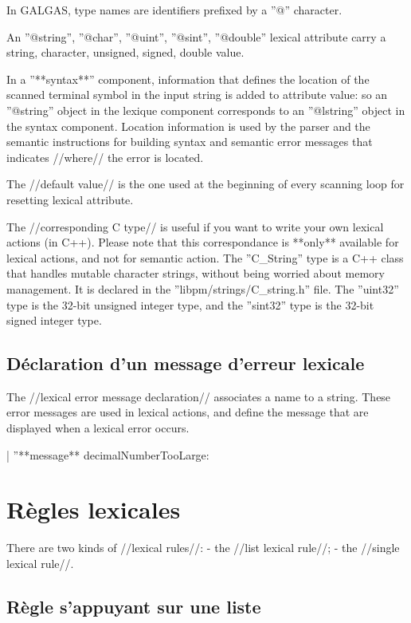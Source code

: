 In GALGAS, type names are identifiers prefixed by a ''@'' character.

An ''@string'', ''@char'', ''@uint'', ''@sint'', ''@double'' lexical attribute carry a string, character, unsigned, signed, double value.

In a ''**syntax**'' component, information that defines the location of the scanned terminal symbol in the input string is added to attribute value: so an ''@string'' object in the lexique component corresponds to an ''@lstring'' object in the syntax component. Location information is used by the parser and the semantic instructions for building syntax and semantic error messages that indicates //where// the error is located.

The //default value// is the one used at the beginning of every scanning loop for resetting lexical attribute.

The //corresponding C type// is useful if you want to write your own lexical actions (in C++). Please note that this correspondance is **only** available for lexical actions, and not for semantic action. The ''C\_String'' type is a C++ class that handles mutable character strings, without being worried about memory management. It is declared in the ''libpm/strings/C\_string.h'' file. The ''uint32'' type is the 32-bit unsigned integer type, and the ''sint32'' type is the 32-bit signed integer type. 
 

\subsection{Déclaration d'un message d'erreur lexicale}

The //lexical error message declaration// associates a name to a string. These error messages are used in lexical actions, and define the message that are displayed when a lexical error occurs.

|  ''**message** decimalNumberTooLarge: %

 

\section{Règles lexicales}

There are two kinds of //lexical rules//:
  - the //list lexical rule//;
  - the //single lexical rule//.

\subsection{Règle s'appuyant sur une liste}

